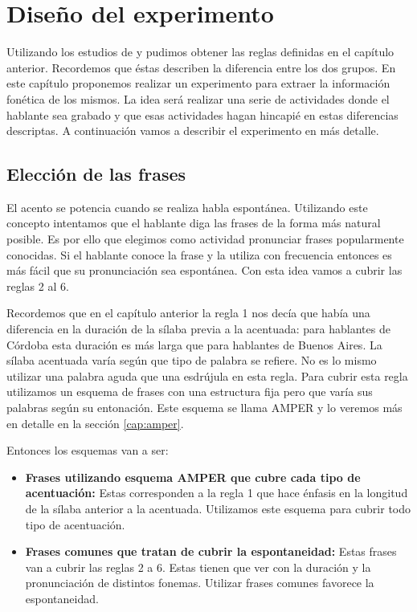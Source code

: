 \chapter{Diseño del experimento}

Utilizando los estudios de \cite{Fontanella2000} y \cite{Vidal1964} pudimos obtener las reglas definidas en el capítulo anterior. Recordemos que éstas describen la diferencia entre los dos grupos. En este capítulo proponemos realizar un experimento para extraer la información fonética de los mismos. La idea será realizar una serie de actividades donde el hablante sea grabado y que esas actividades hagan hincapié en estas diferencias descriptas. A continuación vamos a describir el experimento en más detalle.

\section{Elección de las frases}

El acento se potencia cuando se realiza habla espontánea. Utilizando este concepto intentamos que el hablante diga las frases de la forma más natural posible. Es por ello que elegimos como actividad pronunciar frases popularmente conocidas. Si el hablante conoce la frase y la utiliza con frecuencia entonces es más fácil que su pronunciación sea espontánea. Con esta idea vamos a cubrir las reglas 2 al 6. 

Recordemos que en el capítulo anterior la regla 1 nos decía que había una diferencia en la duración de la sílaba previa a la acentuada: para hablantes de Córdoba esta duración es más larga que para hablantes de Buenos Aires. La sílaba acentuada varía según que tipo de palabra se refiere. No es lo mismo utilizar una palabra aguda que una esdrújula en esta regla. Para cubrir esta regla utilizamos un esquema de frases con una estructura fija pero que varía sus palabras según su entonación. Este esquema se llama AMPER \cite{amper} y lo veremos más en detalle en la sección \ref{cap:amper}.

Entonces los esquemas van a ser: 

\begin{itemize}
  \item \textbf{Frases utilizando esquema AMPER que cubre cada tipo de acentuación:} Estas corresponden a la regla 1 que hace énfasis en la longitud de la sílaba anterior a la acentuada. Utilizamos este esquema para cubrir todo tipo de acentuación.
  \item \textbf{Frases comunes que tratan de cubrir la espontaneidad:} Estas frases van a cubrir las reglas 2 a 6. Estas tienen que ver con la duración y la pronunciación de distintos fonemas. Utilizar frases comunes favorece la espontaneidad.
\end{itemize}

